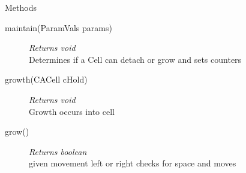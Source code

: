 \documentclass[11pt,a4paper]{article}
\newenvironment{di}
{\begin{flushright}
\begin{minipage}{0.95\textwidth}
\begin{description}
}
{\end{description}
\end{minipage}
\end{flushright}
}
\begin{document}
\colorbox{descriptbg}{\parbox{1.0\textwidth}{\Large{Methods}}}
\begin{di}
\item[{maintain(ParamVals params)}]\emph{Returns void}\\
Determines if a Cell can detach or grow and sets counters\\
\item[{growth(CACell cHold)}]\emph{Returns void}\\
Growth occurs into cell\\
\item[{grow()}]\emph{Returns boolean}\\
given movement left or right checks for space and moves\\
\end{di}
\end{document}
